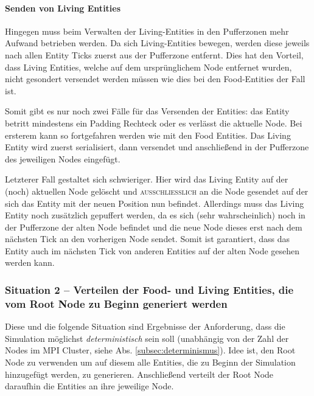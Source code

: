 \documentclass[course=erap]{aspdoc}
\begin{document}
\paragraph{Senden von Living Entities}
Hingegen muss beim Verwalten der Living-Entities in den Pufferzonen mehr Aufwand betrieben werden. Da sich Living-Entities bewegen, werden diese jeweils nach allen Entity Ticks zuerst aus der Pufferzone entfernt. Dies hat den Vorteil, dass Living Entities, welche auf dem ursprünglichem Node entfernet wurden, nicht gesondert versendet werden müssen wie dies bei den Food-Entities der Fall ist.

Somit gibt es nur noch zwei Fälle für das Versenden der Entities: das Entity betritt mindestens ein Padding Rechteck oder es verlässt die aktuelle Node. Bei ersterem kann so fortgefahren werden wie mit den Food Entities. Das Living Entity wird zuerst serialisiert, dann versendet und anschließend in der Pufferzone des jeweiligen Nodes eingefügt.

Letzterer Fall gestaltet sich schwieriger. Hier wird das Living Entity auf der (noch) aktuellen Node gelöscht und \textsc{ausschließlich} an die Node gesendet auf der sich das Entity mit der neuen Position nun befindet. Allerdings muss das Living Entity noch zusätzlich gepuffert werden, da es sich (sehr wahrscheinlich) noch in der Pufferzone der alten Node befindet und die neue Node dieses erst nach dem nächsten Tick an den vorherigen Node sendet. Somit ist garantiert, dass das Entity auch im nächsten Tick von anderen Entities auf der alten Node gesehen werden kann.


\subsubsection{Situation 2 -- Verteilen der Food- und Living Entities, die vom Root Node zu Beginn generiert werden}
\label{subsubsec:mpi-situation-2}
Diese und die folgende Situation sind Ergebnisse der Anforderung, dass die Simulation möglichst \emph{deterministisch} sein soll (unabhängig von der Zahl der Nodes im MPI Cluster, siehe Abs. \ref{subsec:determinismus}). Idee ist, den Root Node zu verwenden um auf diesem alle Entities, die zu Beginn der Simulation hinzugefügt werden, zu generieren. Anschließend verteilt der Root Node daraufhin die Entities an ihre jeweilige Node.
\end{document}
